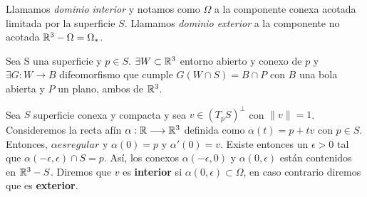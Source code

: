 \begin{definition}
Llamamos \textit{dominio interior} y notamos como $\Omega$ a la componente conexa acotada limitada por la superficie $S$. Llamamos \textit{dominio exterior} a la componente no acotada $\mathbb{R}^3 - \Omega=\Omega_{*}$.
\end{definition}

\begin{lemma}
Sea S una superficie y $p \in S$. $\exists W \subset \mathbb{R}^3$ entorno abierto y conexo de $p$ y $\exists G: W \longrightarrow B$ difeomorfismo que cumple $G(W\cap S) = B\cap P$ con $B$ una bola abierta y $P$ un plano, ambos de $\mathbb{R}^3$.
\end{lemma}

\begin{definition}
Sea $S$ superficie conexa y compacta y sea $v \in (T_pS)^{\perp}$ con $\parallel v \parallel=1$. Consideremos la recta afín $\alpha: \mathbb{R} \longrightarrow \mathbb{R}^3$ definida como $\alpha(t) = p + tv$ con $p \in S$. Entonces, $\alpha es regular$ y $\alpha(0)=p$ y $\alpha'(0) = v$. Existe entonces un $\epsilon > 0$ tal que $\alpha(-\epsilon, \epsilon) \cap S = {p}$. Así, los conexos $\alpha(-\epsilon, 0)$ y $\alpha(0, \epsilon)$ están contenidos en $\mathbb{R}^3 - S$. Diremos que $v$ es \textbf{interior} si $\alpha(0, \epsilon) \subset \Omega$, en caso contrario diremos que es \textbf{exterior}. 
\end{definition}

